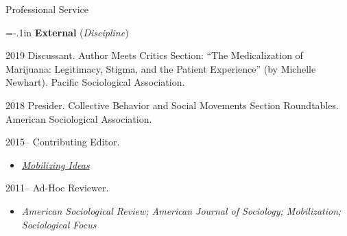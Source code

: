 \begin{rSection}{Professional Service}
\noindent \vspace*{-1.5em}

{\parindent=-.1in \bf External} (\textit{Discipline})

\begin{hangt}{2019 \datefill}
Discussant. Author Meets Critics Section: ``The Medicalization of Marijuana: Legitimacy, Stigma, and the Patient Experience'' (by Michelle Newhart). Pacific Sociological Association. 
\end{hangt}

\begin{hangt}{2018 \datefill}
Presider. Collective Behavior and Social Movements Section Roundtables. American Sociological Association. 
\end{hangt}


\begin{hangt}{2015--\hspace{-.15em}\datefill}
Contributing Editor.
\vspace*{-.5em} 
\begin{itemize}[leftmargin=.25in] \vspace*{-.25em} 
\item {\footnotesize \href{http://mobilizingideas.wordpress.com/burrel-vann-jr/}{\it Mobilizing Ideas}}
\end{itemize}
\end{hangt}


\begin{hangt}{2011--\hspace{-.15em}\datefill}
Ad-Hoc Reviewer.
\vspace*{-.5em} 
\begin{itemize}[leftmargin=.25in] \vspace*{-.25em} 
\item {\footnotesize \it American Sociological Review\textup{;} American Journal of Sociology\textup{;} Mobilization\textup{;} Sociological Focus}
\end{itemize}
\end{hangt}


\end{rSection}
